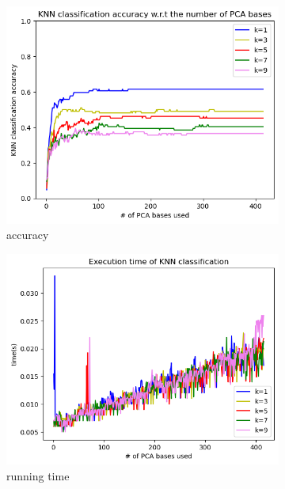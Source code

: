 \begin{figure}[htbp]
	\centering
	\begin{subfigure}[t]{0.3\linewidth}
		\centering
		\includegraphics[width=\linewidth]{image/q1_accuracy.png}
		\caption{accuracy}
		\label{fig:q1_knn_accuracy}
	\end{subfigure}	
    \hfill
	\begin{subfigure}[t]{0.3\linewidth}
		\centering
		\includegraphics[width=\linewidth]{image/q1_time.png}
		\caption{running time}
		\label{fig:q1_knn_time}
	\end{subfigure}%
    \hfill
	\begin{subfigure}[t]{0.3\linewidth}

\end{subfigure}
\end{figure}

